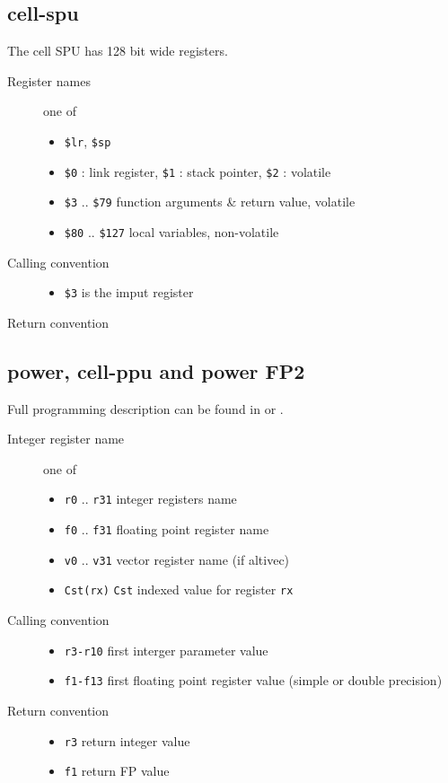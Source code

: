 \documentclass{article}
\begin{document}
\subsection{cell-spu}

The cell SPU has 128 bit wide registers.

\begin{description}
\item[Register names] one of
  \begin{itemize}
  \item \verb|$lr|, \verb|$sp|
  \item \verb|$0| : link register, \verb|$1| : stack pointer,
    \verb|$2| : volatile
  \item \verb|$3| .. \verb|$79| function arguments \& return value, volatile
  \item \verb|$80| .. \verb|$127| local variables, non-volatile
  \end{itemize}
\item[Calling convention] 
  \begin{itemize}
  \item \verb|$3| is the imput register
  \end{itemize}
\item[Return convention] 
\end{description}

\subsection{power, cell-ppu  and power FP2}

Full programming description can be found in \cite{POWERABI1} or
\cite{POWERABI2}.

\begin{description}
\item[Integer register name]  one of
  \begin{itemize}
  \item \verb|r0| .. \verb|r31| integer registers name
  \item \verb|f0| .. \verb|f31| floating point register name
  \item \verb|v0| .. \verb|v31| vector register name (if altivec)
  \item \verb|Cst(rx)| \texttt{Cst} indexed value for register \texttt{rx}
  \end{itemize}
\item[Calling convention] 
  \begin{itemize}
  \item \verb|r3-r10| first interger parameter value
  \item \verb|f1-f13| first floating point register value (simple or double precision)
  \end{itemize}
\item[Return convention] 
  \begin{itemize}
  \item \verb|r3| return integer value
  \item \verb|f1| return FP value
  \end{itemize}

\end{description}
\end{document}
